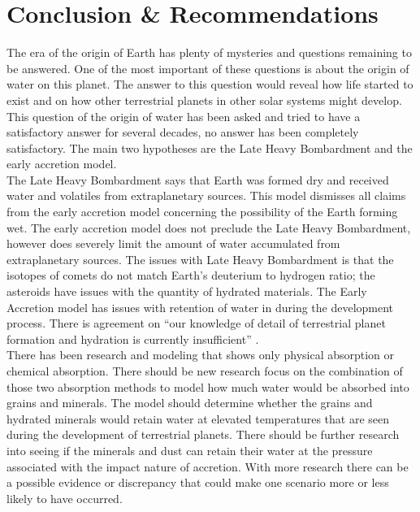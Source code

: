 
\section{\label{chap:conclusion}Conclusion \& Recommendations}

The era of the origin of Earth has plenty of mysteries and questions remaining to be answered. One of the most important of these questions is about the origin of water on this planet. The answer to this question would reveal how life started to exist and on how other terrestrial planets in other solar systems might develop. This question of the origin of water has been asked and tried to have a satisfactory answer for several decades, no answer has been completely satisfactory. The main two hypotheses are the Late Heavy Bombardment and the early accretion model. \\

The Late Heavy Bombardment says that Earth was formed dry and received water and volatiles from extraplanetary sources. This model dismisses all claims from the early accretion model concerning the possibility of the Earth forming wet. The early accretion model does not preclude the Late Heavy Bombardment, however does severely limit the amount of water accumulated from extraplanetary sources. 
The issues with Late Heavy Bombardment is that the isotopes of comets do not match Earth's deuterium to hydrogen ratio; the asteroids have issues with the quantity of hydrated materials. The Early Accretion model has issues with retention of water in during the development process.
There is agreement on “our knowledge of detail of terrestrial planet formation and hydration is currently insufficient” \cite{BOMB14}. \\

There has been research and modeling that shows only physical absorption or chemical absorption. There should be new research focus on the combination of those two absorption methods to model how much water would be absorbed into grains and minerals. 
The model should determine whether the grains and hydrated minerals would retain water at elevated temperatures that are seen during the development of terrestrial planets.
There should be further research into seeing if the minerals and dust can retain their water at the pressure associated with the impact nature of accretion.
With more research there can be a possible evidence or discrepancy that could make one scenario more or less likely to have occurred.
